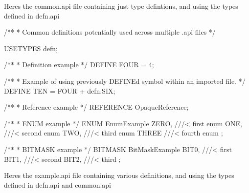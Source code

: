 Here\textquotesingle{}s the {\ttfamily common.\+api} file containing just type defintions, and using the types defined in {\ttfamily defn.\+api} 


\begin{DoxyVerbInclude}
/**
 * Common definitions potentially used across multiple .api files
 */

USETYPES defn;


/**
 * Definition example
 */
DEFINE FOUR = 4;

/**
 * Example of using previously DEFINEd symbol within an imported file.
 */
DEFINE TEN = FOUR + defn.SIX;

/**
 * Reference example
 */
REFERENCE OpaqueReference;

/**
 * ENUM example
 */
ENUM EnumExample
{
    ZERO,     ///< first enum
    ONE,      ///< second enum
    TWO,      ///< third enum
    THREE     ///< fourth enum
};

/**
 * BITMASK example
 */
BITMASK BitMaskExample
{
    BIT0,     ///< first
    BIT1,     ///< second
    BIT2,     ///< third
};


\end{DoxyVerbInclude}


Here\textquotesingle{}s the {\ttfamily example.\+api} file containing various definitions, and using the types defined in {\ttfamily defn.\+api} and {\ttfamily common.\+api} 


